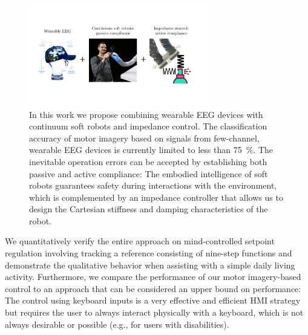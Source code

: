 \begin{figure}[hbt]
    \centering
    \includegraphics[width=0.7\textwidth]{braincontrol/figures/embodied_computational_intelligence/embodied_and_computational_intelligence_cropped.pdf}
    \caption{In this work we propose combining wearable \gls{EEG} devices with continuum soft robots and impedance control. The classification accuracy of motor imagery based on signals from few-channel, wearable \gls{EEG} devices is currently limited to less than \SI{75}{\percent}. The inevitable operation errors can be accepted by establishing both passive and active compliance: The embodied intelligence of soft robots guarantees safety during interactions with the environment, which is complemented by an impedance controller that allows us to design the Cartesian stiffness and damping characteristics of the robot.}
    \label{fig:braincontrol:embodied_computational_intelligence}
\end{figure}
 
We quantitatively verify the entire approach on mind-controlled setpoint regulation involving tracking a reference consisting of nine-step functions and demonstrate the qualitative behavior when assisting with a simple daily living activity. 
Furthermore, we compare the performance of our motor imagery-based control to an approach that can be considered an upper bound on performance: The control using keyboard inputs is a very effective and efficient \gls{HMI} strategy but requires the user to always interact physically with a keyboard,
which is not always desirable or possible (e.g., for users with disabilities).

